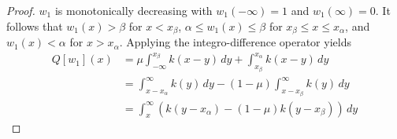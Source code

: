 \documentclass[11pt]{article}
\newtheorem{lem}[thm]{Lemma}
\theoremstyle{definition}
\numberwithin{equation}{section}
\numberwithin{thm}{section}
\renewcommand{\a}{\alpha}
\renewcommand{\b}{\beta}
\newcommand{\m}{\mu}
\begin{document}
\begin{proof}
$w_1$ is monotonically decreasing with $w_1(-\infty)=1$ and $w_1(\infty)=0$. It follows that $w_1(x)>\b$ for $x<x_\b$, $\a\leq w_1(x)\leq\b$ for $x_\b\leq x\leq x_\a$, and $w_1(x)<\a$ for $x>x_\a$. Applying the integro-difference operator yields
\begin{equation} \label{qw1calculation}
\begin{aligned}
Q[w_1](x) %
&= \m \int_{-\infty}^{x_\b} k(x-y) \, dy + \int_{x_\b}^{x_\a} k(x-y) \, dy \\
&= \int_{x-x_\a}^{\infty} k(y) \, dy - (1-\m) \int_{x-x_\b}^{\infty} k(y) \, dy \\
&= \int_{x}^{\infty} \left(k(y-x_\a)  - (1-\m)k(y-x_\b)\right) \, dy
\end{aligned} \end{equation}
\end{proof}



%
%
%
%
%
%
%
\end{document}
